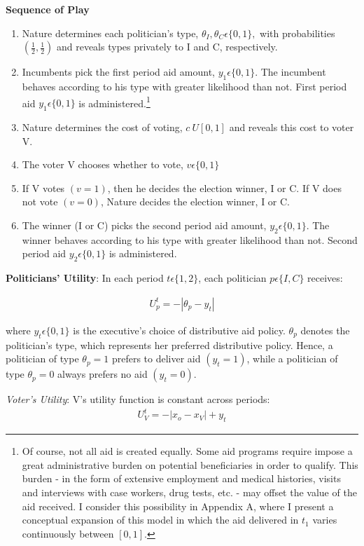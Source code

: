 \documentclass[12pt]{paper}
\begin{document}
\textbf{Sequence of Play}
\begin{enumerate}
	\item Nature determines each politician’s type, $\theta_I, \theta_C \epsilon \{0,1\},$ with probabilities $(\frac{1}{2}, \frac{1}{2})$ and reveals types privately to I and C, respectively.
	\item Incumbents pick the first period aid amount, $y_1\epsilon \{0,1\}.$ The incumbent behaves according to his type with greater likelihood than not. First period aid $y_1\epsilon \{0,1\}$ is administered.\footnote{Of course, not all aid is created equally. Some aid programs require impose a great administrative burden on potential beneficiaries in order to qualify. This burden - in the form of extensive employment and medical histories, visits and interviews with case workers, drug tests, etc. - may offset the value of the aid received. I consider this possibility in Appendix A, where I present a conceptual expansion of this model in which the aid delivered in $t_1$ varies continuously between $[0,1]$.}
	\item Nature determines the cost of voting, $c~U[0,1]$ and reveals this cost to voter V.
	\item The voter V chooses whether to vote, $v \epsilon \{0,1\}$
	\item If V votes $(v=1)$, then he decides the election winner, I or C. If V does not vote $(v=0)$, Nature decides the election winner, I or C.
	\item The winner (I or C) picks the second period aid amount, $y_2 \epsilon \{0,1\}$. The winner behaves according to his type with greater likelihood than not. Second period aid  $y_2 \epsilon \{0,1\}$ is administered.
\end{enumerate}

\textbf{Politicians' Utility}: In each period $t \epsilon \{1,2\}$, each politician $p \epsilon \{I,C\}$ receives: 

\begin{gather}
U_{p}^t = -|\theta_p - y_t|
\end{gather}

where $y_t\epsilon \{0,1\}$ is the executive’s choice of distributive aid policy. $\theta_p$ denotes the politician’s type, which represents her preferred distributive policy. Hence, a politician of type $\theta_p = 1$ prefers to deliver aid $(y_t = 1)$, while a politician of type $\theta_p = 0$ always prefers no aid $(y_t = 0).$

\emph{Voter's Utility}: V’s utility function is constant across periods: 
\begin{gather}
U_{V}^t = -|x_o - x_V| + y_t
\end{gather}
\end{document}
